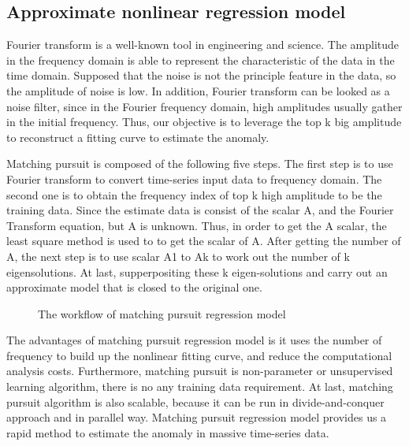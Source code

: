 \documentclass{vgtc}                          %
\begin{document}
\subsection{Approximate nonlinear regression model}

Fourier transform is a well-known tool in engineering and science. The amplitude in the frequency domain is able to represent the characteristic of the data in the time domain. Supposed that the noise is not the principle feature in the data, so the amplitude of noise is low. In addition, Fourier transform can be looked as a noise filter, since in the Fourier frequency domain, high amplitudes usually gather in the initial frequency. Thus, our objective is to leverage the top k big amplitude to reconstruct a fitting curve to estimate the anomaly. 

Matching pursuit is composed of the following five steps. The first step is to use Fourier transform to convert time-series input data to frequency domain. The second one is to obtain the frequency index of top k high amplitude to be the training data. Since the estimate data is consist of the scalar A, and the Fourier Transform equation, but A is unknown. Thus, in order to get the A scalar, the least square method is used to to get the scalar of A. After getting the number of A, the next step is to use scalar A1 to Ak to work out the number of k eigensolutions. At last, supperpositing these k eigen-solutions and carry out an approximate model that is closed to the original one.

\begin{figure}[htb]
	\caption{The workflow of matching pursuit regression model}
\end{figure}

The advantages of matching pursuit regression model is it uses the number of frequency to build up the nonlinear fitting curve, and reduce the computational analysis costs. Furthermore, matching pursuit is non-parameter or unsupervised learning algorithm, there is no any training data requirement. At last, matching pursuit algorithm is also scalable, because it can be run in divide-and-conquer approach and in parallel way. Matching pursuit regression model provides us a rapid method to estimate the anomaly in massive time-series data. 
\end{document}
